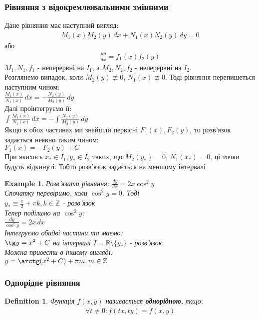\documentclass[a4paper, 10pt]{article}
\theoremstyle{theoremdd}
\theoremstyle{theoremdd}
\newtheorem{definition}[theorem]{Definition}
\theoremstyle{theoremdd}
\theoremstyle{theoremdd}
\newtheorem{example}[theorem]{Example}
\theoremstyle{theoremdd}
\theoremstyle{theoremdd}
\theoremstyle{theoremdd}
\theoremstyle{theoremdd}
\begin{document}
	\subsubsection{Рівняння з відокремлювальними змінними}
	Дане рівняння має наступний вигляд:
	\begin{align*}
	M_1(x)M_2(y)\,dx+N_1(x)N_2(y)\,dy=0
	\end{align*}
	або
	\begin{align*}
	\frac{dy}{dx} = f_1(x) f_2(y)
	\end{align*}
	$M_1, N_1, f_1$ - неперервні на $I_1$, а $M_2, N_2, f_2$ - неперервні на $I_2$.\\
	Розглянемо випадок, коли $M_2(y) \not\equiv 0$, $N_1(x) \not\equiv 0$. Тоді рівняння перепишеться наступним чином:\\
	$\displaystyle \frac{M_1(x)}{N_1(x)}\,dx = -\frac{N_2(y)}{M_2(y)}\,dy$\\
	Далі проінтегруємо її:\\
	$\displaystyle \int \frac{M_1(x)}{N_1(x)}\,dx = - \int \frac{N_2(y)}{M_2(y)}\,dy$\\
	Якщо в обох частинах ми знайшли первісні $F_1(x), F_2(y)$, то розв'язок задається неявно таким чином:\\
	$F_1(x)=-F_2(y)+C$\\
	При якихось $x_* \in I_1, y_* \in I_2$ таких, що $M_2(y_*) = 0$, $N_1(x_*)=0$, ці точки будуть відкинуті. Тобто розв'язок задається на меншому інтервалі
	
	\begin{example}
 Розв'язати рівняння: $\displaystyle \frac{dy}{dx}=2x \cos^2 y$\\
	Спочатку перевіримо, коли $\cos^2 y=0$. Тоді\\ $\displaystyle y_* \equiv \frac{\pi}{2} + \pi k, k \in \mathbb{Z}$ - розв'язок\\
	Тепер поділимо на $\cos ^2 y$:\\
	$\displaystyle \frac{dy}{\cos^2 y} = 2x\,dx$\\
	Інтегруємо обидві частини та маємо:\\
	$\displaystyle \tg y = x^2 + C$ на інтервалі $I = \mathbb{R} \setminus \{y_*\}$ - розв'язок\\
	Можна привести в іншому вигляді:\\
	$y = \arctg (x^2+C) + \pi m, m \in \mathbb{Z}$
	\end{example}
	
	\subsubsection{Однорідне рівняння}
	\begin{definition}
 Функція $f(x,y)$ називається \textbf{однорідною}, якщо:
	\begin{align*}
	\forall t \neq 0: f(tx, ty)=f(x,y)
	\end{align*}
	\end{definition}
	
\end{document}

